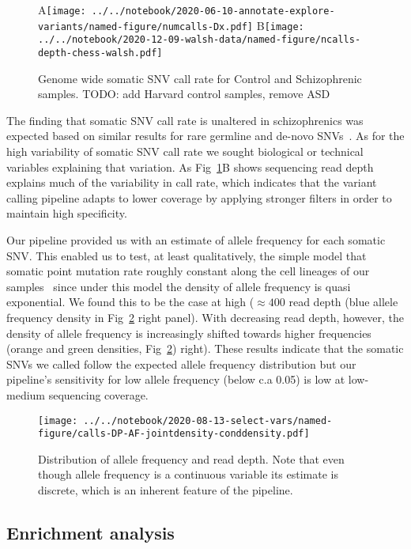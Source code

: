 \documentclass[letterpaper]{article}
\begin{document}
\begin{figure}
A\texttt{[image: ../../notebook/2020-06-10-annotate-explore-variants/named-figure/numcalls-Dx.pdf]}
B\texttt{[image: ../../notebook/2020-12-09-walsh-data/named-figure/ncalls-depth-chess-walsh.pdf]}
\caption{Genome wide somatic SNV call rate for Control and Schizophrenic samples.  TODO:
	add Harvard control samples, remove ASD}
\label{fig:genomewide-calls}
\end{figure}

The finding that somatic SNV call rate is unaltered in schizophrenics was
expected based on similar results for rare germline and de-novo
SNVs~\citep{Purcell2014,Singh2017,Fromer2014,Rees2020}.
As for the high variability of somatic SNV call rate we sought 
biological or technical variables explaining that variation.  As
Fig~\ref{fig:genomewide-calls}B
shows sequencing read depth explains much of
the variability in call rate, which indicates that the variant calling
pipeline adapts to lower coverage by applying stronger filters in order to 
maintain high specificity.

Our pipeline provided us with an estimate of allele frequency for
each somatic SNV.  This enabled us to test, at least qualitatively, the
simple model that somatic point mutation rate roughly constant along the cell lineages of
our samples~\citep{Rodin2021} since under this model the density of allele
frequency is quasi exponential.  We found this to be the case at high
(\(\approx 400\) read depth (blue allele frequency density in Fig~\ref{fig:AF}
right panel).  With decreasing read depth,
however, the density of allele frequency is increasingly shifted towards
higher frequencies (orange and green densities, Fig~\ref{fig:AF})
right).  These results indicate that the somatic SNVs we called
follow the expected allele frequency distribution but our pipeline's sensitivity for
low allele frequency (below c.a 0.05) is low at low-medium sequencing
coverage.

\begin{figure}
\texttt{[image: ../../notebook/2020-08-13-select-vars/named-figure/calls-DP-AF-jointdensity-conddensity.pdf]}
\caption{
Distribution of allele frequency and read depth.  Note that even though allele frequency is
a continuous variable its estimate is discrete, which is an inherent feature
of the pipeline.
}
\label{fig:AF}
\end{figure}

\subsection*{Enrichment analysis}
\end{document}
